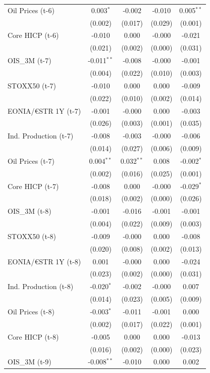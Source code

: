 \begin{longtable}[t]{lcccc}
Oil Prices (t-6) & 0.003$^{*}$ & -0.002 & -0.010 & 0.005$^{**}$\\
 & (0.002) & (0.017) & (0.029) & (0.001)\\
Core HICP (t-6) & -0.010 & 0.000 & -0.000 & -0.021\\
 & (0.021) & (0.002) & (0.000) & (0.031)\\
OIS\_3M (t-7) & -0.011$^{**}$ & -0.008 & -0.000 & -0.001\\
 & (0.004) & (0.022) & (0.010) & (0.003)\\
STOXX50 (t-7) & -0.010 & 0.000 & 0.000 & -0.009\\
 & (0.022) & (0.010) & (0.002) & (0.014)\\
EONIA/€STR 1Y (t-7) & -0.001 & -0.000 & 0.000 & -0.003\\
 & (0.026) & (0.003) & (0.001) & (0.035)\\
Ind. Production (t-7) & -0.008 & -0.003 & -0.000 & -0.006\\
 & (0.014) & (0.027) & (0.006) & (0.009)\\
Oil Prices (t-7) & 0.004$^{**}$ & 0.032$^{**}$ & 0.008 & -0.002$^{*}$\\
 & (0.002) & (0.016) & (0.025) & (0.001)\\
Core HICP (t-7) & -0.008 & 0.000 & -0.000 & -0.029$^{*}$\\
 & (0.018) & (0.002) & (0.000) & \vphantom{1} (0.026)\\
OIS\_3M (t-8) & -0.001 & -0.016 & -0.001 & -0.001\\
 & (0.004) & (0.022) & (0.009) & (0.003)\\
STOXX50 (t-8) & -0.009 & -0.000 & 0.000 & -0.008\\
 & (0.020) & (0.008) & (0.002) & (0.013)\\
EONIA/€STR 1Y (t-8) & 0.001 & -0.000 & 0.000 & -0.024\\
 & (0.023) & (0.002) & (0.000) & (0.031)\\
Ind. Production (t-8) & -0.020$^{*}$ & -0.002 & -0.000 & 0.007\\
 & (0.014) & (0.023) & (0.005) & (0.009)\\
Oil Prices (t-8) & -0.003$^{*}$ & -0.011 & -0.001 & 0.000\\
 & (0.002) & (0.017) & (0.022) & (0.001)\\
Core HICP (t-8) & -0.005 & 0.000 & 0.000 & -0.013\\
 & (0.016) & (0.002) & (0.000) & (0.023)\\
OIS\_3M (t-9) & -0.008$^{**}$ & -0.010 & 0.000 & 0.002\\

\end{longtable}
